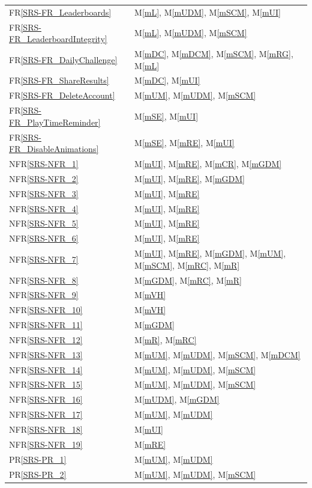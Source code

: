 \documentclass[12pt, titlepage]{article}
\newcommand{\rref}[1]{FR\ref{SRS-#1}}
\newcommand{\nfrref}[1]{NFR\ref{SRS-#1}}
\newcommand{\prref}[1]{PR\ref{SRS-#1}}
\newcommand{\mref}[1]{M\ref{#1}}
\begin{document}
\begin{longtable}{p{} p{}}
\rref{FR_Leaderboards} & \mref{mL}, \mref{mUDM}, \mref{mSCM}, \mref{mUI}\\
\rref{FR_LeaderboardIntegrity} & \mref{mL}, \mref{mUDM}, \mref{mSCM}\\
\rref{FR_DailyChallenge} & \mref{mDC}, \mref{mDCM}, \mref{mSCM}, \mref{mRG}, \mref{mL}\\
\rref{FR_ShareResults} & \mref{mDC}, \mref{mUI}\\
\rref{FR_DeleteAccount} & \mref{mUM}, \mref{mUDM}, \mref{mSCM}\\
\rref{FR_PlayTimeReminder} & \mref{mSE}, \mref{mUI}\\
\rref{FR_DisableAnimations} & \mref{mSE}, \mref{mRE}, \mref{mUI}\\
\midrule
\nfrref{NFR_1} & \mref{mUI}, \mref{mRE}, \mref{mCR}, \mref{mGDM}\\
\nfrref{NFR_2} & \mref{mUI}, \mref{mRE}, \mref{mGDM}\\
\nfrref{NFR_3} & \mref{mUI}, \mref{mRE}\\
\nfrref{NFR_4} & \mref{mUI}, \mref{mRE}\\
\nfrref{NFR_5} & \mref{mUI}, \mref{mRE}\\
\nfrref{NFR_6} & \mref{mUI}, \mref{mRE}\\
\nfrref{NFR_7} & \mref{mUI}, \mref{mRE}, \mref{mGDM}, \mref{mUM}, \mref{mSCM}, \mref{mRC}, \mref{mR}\\
\nfrref{NFR_8} & \mref{mGDM}, \mref{mRC}, \mref{mR}\\
\nfrref{NFR_9} & \mref{mVH}\\
\nfrref{NFR_10} & \mref{mVH}\\
\nfrref{NFR_11} & \mref{mGDM}\\
\nfrref{NFR_12} & \mref{mR}, \mref{mRC}\\
\nfrref{NFR_13} & \mref{mUM}, \mref{mUDM}, \mref{mSCM}, \mref{mDCM}\\
\nfrref{NFR_14} & \mref{mUM}, \mref{mUDM}, \mref{mSCM}\\
\nfrref{NFR_15} & \mref{mUM}, \mref{mUDM}, \mref{mSCM}\\
\nfrref{NFR_16} & \mref{mUDM}, \mref{mGDM}\\
\nfrref{NFR_17} & \mref{mUM}, \mref{mUDM}\\
\nfrref{NFR_18} & \mref{mUI}\\
\nfrref{NFR_19} & \mref{mRE}\\
\midrule
\prref{PR_1} & \mref{mUM}, \mref{mUDM}\\
\prref{PR_2} & \mref{mUM}, \mref{mUDM}, \mref{mSCM}\\

\end{longtable}
\end{document}
